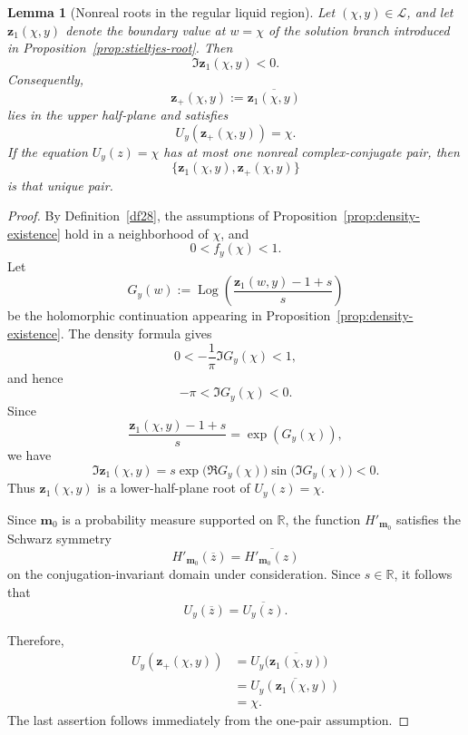 \documentclass[11pt]{amsart}
\theoremstyle{plain}
\newtheorem{lemma}[theorem]{Lemma}
\numberwithin{equation}{section}
\numberwithin{theorem}{section}
\numberwithin{figure}{section}
\begin{document}
\begin{lemma}[Nonreal roots in the regular liquid region]
\label{lem:liquid-nonreal-root}
Let \((\chi,y)\in\mathcal L\), and let
\(\mathbf z_1(\chi,y)\) denote the boundary value at \(w=\chi\) of the
solution branch introduced in
Proposition~\ref{prop:stieltjes-root}. Then
\[
    \Im \mathbf z_1(\chi,y)<0.
\]
Consequently,
\[
    \mathbf z_+(\chi,y)
    :=
    \overline{\mathbf z_1(\chi,y)}
\]
lies in the upper half-plane and satisfies
\[
    U_y(\mathbf z_+(\chi,y))=\chi.
\]
If the equation \(U_y(z)=\chi\) has at most one nonreal
complex-conjugate pair, then
\[
    \bigl\{
        \mathbf z_1(\chi,y),
        \mathbf z_+(\chi,y)
    \bigr\}
\]
is that unique pair.
\end{lemma}

\begin{proof}
By Definition~\ref{df28}, the assumptions of
Proposition~\ref{prop:density-existence} hold in a neighborhood of
\(\chi\), and
\[
    0<f_y(\chi)<1.
\]
Let
\[
    G_y(w)
    :=
    \operatorname{Log}\!\left(
        \frac{\mathbf z_1(w,y)-1+s}{s}
    \right)
\]
be the holomorphic continuation appearing in
Proposition~\ref{prop:density-existence}. The density formula gives
\[
    0
    <
    -\frac{1}{\pi}\Im G_y(\chi)
    <
    1,
\]
and hence
\[
    -\pi<\Im G_y(\chi)<0.
\]
Since
\[
    \frac{\mathbf z_1(\chi,y)-1+s}{s}
    =
    \exp(G_y(\chi)),
\]
we have
\[
    \Im\mathbf z_1(\chi,y)
    =
    s\exp\bigl(\Re G_y(\chi)\bigr)
    \sin\bigl(\Im G_y(\chi)\bigr)
    <0.
\]
Thus \(\mathbf z_1(\chi,y)\) is a lower-half-plane root of
\(U_y(z)=\chi\).

Since \(\mathbf m_0\) is a probability measure supported on
\(\mathbb R\), the function \(H'_{\mathbf m_0}\) satisfies the
Schwarz symmetry
\[
    H'_{\mathbf m_0}(\overline z)
    =
    \overline{H'_{\mathbf m_0}(z)}
\]
on the conjugation-invariant domain under consideration. Since
\(s\in\mathbb R\), it follows that
\[
    U_y(\overline z)
    =
    \overline{U_y(z)}.
\]


Therefore,
\[
\begin{aligned}
    U_y(\mathbf z_+(\chi,y))
    &=
    U_y\bigl(\overline{\mathbf z_1(\chi,y)}\bigr) \\
    &=
    \overline{U_y(\mathbf z_1(\chi,y))} \\
    &=
    \chi.
\end{aligned}
\]
The last assertion follows immediately from the one-pair assumption.
\end{proof}
\end{document}
